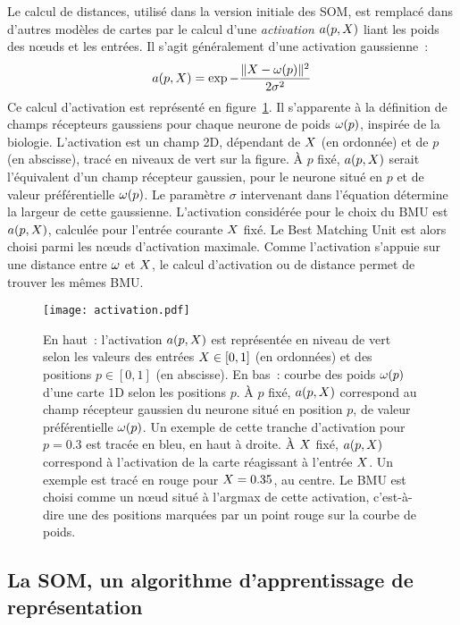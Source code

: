 \documentclass[../main]{subfiles}
\begin{document}
Le calcul de distances, utilisé dans la version initiale des SOM, est remplacé dans d'autres modèles de cartes par le calcul d'une \emph{activation} $a(p, X)$ liant les poids des n\oe{}uds et les entrées. Il s'agit généralement d'une activation gaussienne~:
\begin{equation}\label{eq:activation}
    a(p, X) = \exp{-\frac{\lVert X- \omega(p)\rVert^2}{2\sigma^2}}
\end{equation}
Ce calcul d'activation est représenté en figure~\ref{fig:activation}. Il s'apparente à la définition de champs récepteurs gaussiens pour chaque neurone de poids $\omega(p)$, inspirée de la biologie.
L'activation est un champ 2D, dépendant de $X$ (en ordonnée) et de $p$ (en abscisse), tracé en niveaux de vert sur la figure.
\`A $p$ fixé, $a(p,X)$ serait l'équivalent d'un champ récepteur gaussien, pour le neurone situé en $p$ et de valeur préférentielle $\omega(p)$. 
Le paramètre $\sigma$ intervenant dans l'équation détermine la largeur de cette gaussienne.
L'activation considérée pour le choix du BMU est $a(p,X)$, calculée pour l'entrée courante $X$ fixé. Le Best Matching Unit est alors choisi parmi les n\oe{}uds d'activation maximale.
Comme l'activation s'appuie sur une distance entre $\omega$ et $X$, le calcul d'activation ou de distance permet de trouver les mêmes BMU.

\begin{figure}
    \centering\texttt{[image: activation.pdf]}
    \caption{En haut~: l'activation $a(p, X)$ est représentée en niveau de vert selon les valeurs des entrées $X \in [0,1]$ (en ordonnées) et des positions $p \in [0,1]$ (en abscisse).
    En bas~: courbe des poids $\omega(p)$ d'une carte 1D selon les positions $p$. 
    \`A  $p$ fixé, $a(p, X)$ correspond au champ récepteur gaussien du neurone situé en position $p$, de valeur préférentielle $\omega(p)$. 
    Un exemple de cette tranche d'activation pour $p = 0.3$ est tracée en bleu, en haut à droite.
    \`A $X$ fixé, $a(p, X)$ correspond à l'activation de la carte réagissant à l'entrée $X$. Un exemple est tracé en rouge pour $X = 0.35$, au centre.
    Le BMU est choisi comme un n\oe{}ud situé à l'argmax de cette activation, c'est-à-dire une des positions marquées par un point rouge sur la courbe de poids. \label{fig:activation}
    }
\end{figure}

\subsection{La SOM, un algorithme d'apprentissage de représentation}
\end{document}

